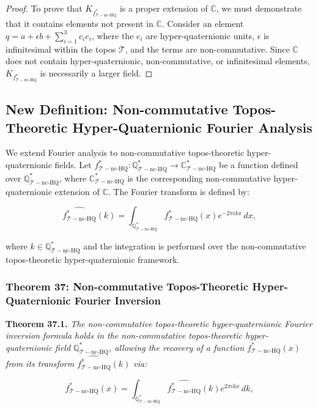 \documentclass{article}
\begin{document}
\begin{proof}
To prove that \(K_{f_{\mathcal{T}-\text{nc-HQ}}^*}\) is a proper extension of \(\mathbb{C}\), we must demonstrate that it contains elements not present in \(\mathbb{C}\). Consider an element \(q = a + \epsilon b + \sum_{i=1}^{3} c_i e_i\), where the \(e_i\) are hyper-quaternionic units, \(\epsilon\) is infinitesimal within the topos \(\mathcal{T}\), and the terms are non-commutative. Since \(\mathbb{C}\) does not contain hyper-quaternionic, non-commutative, or infinitesimal elements, \(K_{f_{\mathcal{T}-\text{nc-HQ}}^*}\) is necessarily a larger field.
\end{proof}

\subsection{New Definition: Non-commutative Topos-Theoretic Hyper-Quaternionic Fourier Analysis}
We extend Fourier analysis to non-commutative topos-theoretic hyper-quaternionic fields. Let \(f_{\mathcal{T}-\text{nc-HQ}}^*: \mathbb{Q}_{\mathcal{T}-\text{nc-HQ}}^* \to \mathbb{C}_{\mathcal{T}-\text{nc-HQ}}^*\) be a function defined over \(\mathbb{Q}_{\mathcal{T}-\text{nc-HQ}}^*\), where \(\mathbb{C}_{\mathcal{T}-\text{nc-HQ}}^*\) is the corresponding non-commutative hyper-quaternionic extension of \(\mathbb{C}\). The Fourier transform is defined by:

\[
\widehat{f_{\mathcal{T}-\text{nc-HQ}}^*}(k) = \int_{\mathbb{Q}_{\mathcal{T}-\text{nc-HQ}}^*} f_{\mathcal{T}-\text{nc-HQ}}^*(x) e^{-2\pi i k x} \, dx,
\]

where \(k \in \mathbb{Q}_{\mathcal{T}-\text{nc-HQ}}^*\) and the integration is performed over the non-commutative topos-theoretic hyper-quaternionic framework.

\subsubsection{Theorem 37: Non-commutative Topos-Theoretic Hyper-Quaternionic Fourier Inversion}
\textbf{Theorem 37.1.} \textit{The non-commutative topos-theoretic hyper-quaternionic Fourier inversion formula holds in the non-commutative topos-theoretic hyper-quaternionic field \(\mathbb{Q}_{\mathcal{T}-\text{nc-HQ}}^*\), allowing the recovery of a function \(f_{\mathcal{T}-\text{nc-HQ}}^*(x)\) from its transform \(\widehat{f_{\mathcal{T}-\text{nc-HQ}}^*}(k)\) via:}

\[
f_{\mathcal{T}-\text{nc-HQ}}^*(x) = \int_{\mathbb{Q}_{\mathcal{T}-\text{nc-HQ}}^*} \widehat{f_{\mathcal{T}-\text{nc-HQ}}^*}(k) e^{2\pi i k x} \, dk,
\]
\end{document}
